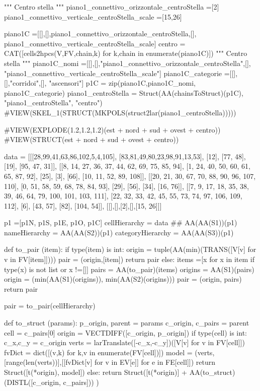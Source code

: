 """ Centro stella """
piano1_connettivo_orizzontale_centroStella =[2]
piano1_connettivo_verticale_centroStella_scale =[15,26]

piano1C =[[],[],piano1_connettivo_orizzontale_centroStella,[], piano1_connettivo_verticale_centroStella_scale]
centro = CAT([cells2hpcs(V,FV,chain,k) for k,chain in enumerate(piano1C)])
""" Centro stella """
piano1C_nomi =[[],[],"piano1_connettivo_orizzontale_centroStella",[], "piano1_connettivo_verticale_centroStella_scale"]
piano1C_categorie =[[],[],"corridoi",[], "ascensori"]
p1C = zip(piano1C,piano1C_nomi, piano1C_categorie)
piano1_centroStella = Struct(AA(chainsToStruct)(p1C), "piano1_centroStella", "centro")
#VIEW(SKEL_1(STRUCT(MKPOLS(struct2lar(piano1_centroStella)))))

#VIEW(EXPLODE(1.2,1.2,1.2)(est + nord + sud + ovest + centro))
#VIEW(STRUCT(est + nord + sud + ovest + centro))




data = [[[28,99,41,63,86,102,5,4,105],
 [83,81,49,80,23,98,91,13,53],
 [12],
 [77, 48],
 [19],
 [95, 47, 31]],
[[8, 14, 27, 36, 37, 44, 62, 69, 75, 85, 94],
 [1, 24, 40, 50, 60, 61, 65, 87, 92],
 [25],
 [3],
 [66],
 [10, 11, 52, 89, 108]],
[[20, 21, 30, 67, 70, 88, 90, 96, 107, 110],
 [0, 51, 58, 59, 68, 78, 84, 93],
 [29],
 [56],
 [34],
 [16, 76]],
[[7, 9, 17, 18, 35, 38, 39, 46, 64, 79, 100, 101, 103, 111],
 [22, 32, 33, 42, 45, 55, 73, 74, 97, 106, 109, 112],
 [6],
 [43, 57],
 [82],
 [104, 54]],
[[],[],[2],[],[15, 26]]]


p1 =[p1N, p1S, p1E, p1O, p1C]
cellHierarchy = data  ## AA(AA(S1))(p1)
nameHierarchy = AA(AA(S2))(p1)
categoryHierarchy = AA(AA(S3))(p1)


def to_pair (item):
  if type(item) is int:
    origin = tuple(AA(min)(TRANS([V[v] for v in FV[item]])))
    pair = (origin,[item])
    return pair
  else:
    items =[x for x in item if type(x) is not list or x !=[]]
    pairs = AA(to_pair)(items)
    origins = AA(S1)(pairs)
    origin = (min(AA(S1)(origins)), min(AA(S2)(origins)))
    pair = (origin, pairs)
    return pair
    
pair = to_pair(cellHierarchy)

def to_struct (params):
    p_origin, parent = params
    c_origin, c_pairs = parent
    cell = c_pairs[0]
    origin = VECTDIFF([c_origin, p_origin])
    if type(cell) is int:        
        c_x,c_y = c_origin
        verts = larTranslate([-c_x,-c_y])([V[v] for v in FV[cell]])
        fvDict = dict([(v,k) for k,v in enumerate(FV[cell])])
        model = (verts,[range(len(verts))],[[fvDict[v] for v in EV[e]] for e in FE[cell]])
        return Struct([t(*origin), model])
    else:
        return Struct([t(*origin)] + AA(to_struct)(DISTL([c_origin, c_pairs])) )


